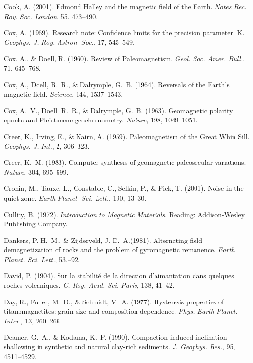 \documentclass[,plain]{tauxe}
\begin{document}
\begin{thebibliography}{}
\bibitem{}%
Cook, A. (2001).
Edmond Halley and the magnetic field of the Earth.
{\it Notes Rec. Roy. Soc. London}, 55, 473--490.

\bibitem{}%
Cox, A. (1969).
Research note: Confidence limits for the precision parameter, K.
{\it Geophys. J. Roy. Astron. Soc.}, 17, 545--549.

\bibitem{}%
Cox, A., \& Doell, R. (1960).
Review of Paleomagnetism.
{\it Geol. Soc. Amer. Bull.}, 71, 645--768.

\bibitem{}%
Cox, A., Doell, R.~R., \& Dalrymple, G.~B. (1964).
Reversals of the Earth's magnetic field.
{\it Science}, 144, 1537--1543.

\bibitem{}%
Cox, A.~V., Doell, R.~R., \& Dalrymple, G.~B. (1963).
Geomagnetic polarity epochs and Pleistocene geochronometry.
{\it Nature}, 198, 1049--1051.

\bibitem{}%
Creer, K., Irving, E., \& Nairn, A. (1959).
Paleomagnetism of the Great Whin Sill.
{\it Geophys. J. Int.}, 2, 306--323.

\bibitem{}%
Creer, K.~M. (1983).
Computer synthesis of geomagnetic paleosecular variations.
{\it Nature}, 304, 695--699.

\bibitem{}%
Cronin, M., Tauxe, L., Constable, C., Selkin, P., \& Pick, T. (2001).
Noise in the quiet zone.
{\it Earth Planet. Sci. Lett.}, 190, 13--30.

\bibitem{}%
Cullity, B. (1972).
{\it Introduction to Magnetic Materials}.
Reading: Addison-Wesley Publishing Company.

\bibitem{}%
Dankers, P. H.~M., \& Zijderveld, J. D.~A.\break (1981).
Alternating field demagnetization of rocks and the problem of gyromagnetic remanence.
{\it Earth Planet. Sci. Lett.}, 53,--92.

\bibitem{}%
David, P. (1904).
Sur la stabilit\'e de la direction d'aimantation dans quelques roches volcaniques.
{\it C. Roy. Acad. Sci. Paris}, 138, 41--42.

\bibitem{}%
Day, R., Fuller, M.~D., \& Schmidt, V.~A. (1977).
Hysteresis properties of titanomagnetites: grain size and composition dependence.
{\it Phys. Earth Planet. Inter.}, 13, 260--266.

\bibitem{}%
Deamer, G.~A., \& Kodama, K.~P. (1990).
Compaction-induced inclination shallowing in synthetic and natural clay-rich sediments.
{\it J. Geophys. Res.}, 95, 4511--4529.


\end{thebibliography}
\end{document}
